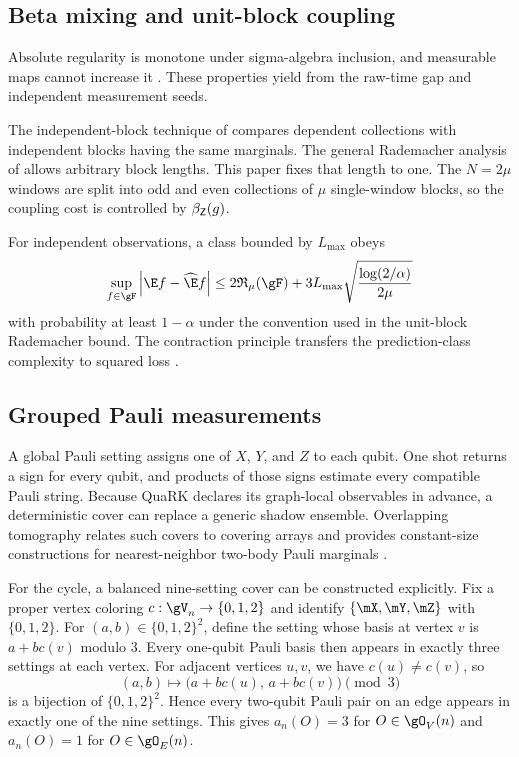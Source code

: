 \subsection{Beta mixing and unit-block coupling}

Absolute regularity is monotone under sigma-algebra inclusion, and measurable
maps cannot increase it \citep{Bradley2005}. These properties yield
 from the raw-time gap and independent
measurement seeds.

The independent-block technique of \citet{Yu1994} compares dependent
collections with independent blocks having the same marginals. The general
Rademacher analysis of \citet{MohriRostamizadeh2008} allows arbitrary block
lengths. This paper fixes that length to one. The $N=2\mu$ windows are split
into odd and even collections of $\mu$ single-window blocks, so the coupling
cost is controlled by $\beta_{\mathsf Z}(g)$.

For independent observations, a class bounded by $L_{\max}$ obeys
\begin{equation}
    \sup_{f\in\gF}\abs{\E f-\widehat\E f}
    \leq
    2\Rad_\mu(\gF)
    +3L_{\max}\sqrt{\frac{\log(2/\alpha)}{2\mu}}
    \label{eq:iid-rademacher-background}
\end{equation}
with probability at least $1-\alpha$ under the convention used in the
unit-block Rademacher bound. The contraction principle transfers the
prediction-class complexity to squared loss
\citep{BartlettMendelson2002}.

\subsection{Grouped Pauli measurements}
\label{app:grouped-pauli-measurements}

A global Pauli setting assigns one of $X$, $Y$, and $Z$ to each qubit. One shot
returns a sign for every qubit, and products of those signs estimate every
compatible Pauli string. Because QuaRK declares its graph-local observables in
advance, a deterministic cover can replace a generic shadow ensemble.
Overlapping tomography relates such covers to covering arrays and provides
constant-size constructions for nearest-neighbor two-body Pauli marginals
\citep{HansenneEtAl2024}.

For the cycle, a balanced nine-setting cover can be constructed explicitly.
Fix a proper vertex coloring $c:\gV_n\to\{0,1,2\}$ and identify
$\{\pauliX,\pauliY,\pauliZ\}$ with $\{0,1,2\}$. For
$(a,b)\in\{0,1,2\}^2$, define the setting whose basis at vertex $v$ is
$a+bc(v)$ modulo $3$. Every one-qubit Pauli basis then appears in exactly
three settings at each vertex. For adjacent vertices $u,v$, we have
$c(u)\neq c(v)$, so
\[
    (a,b)\longmapsto
    \bigl(a+bc(u),\,a+bc(v)\bigr)\pmod 3
\]
is a bijection of $\{0,1,2\}^2$. Hence every two-qubit Pauli pair on an edge
appears in exactly one of the nine settings. This gives $a_n(O)=3$ for
$O\in\gO_V(n)$ and $a_n(O)=1$ for $O\in\gO_E(n)$.

